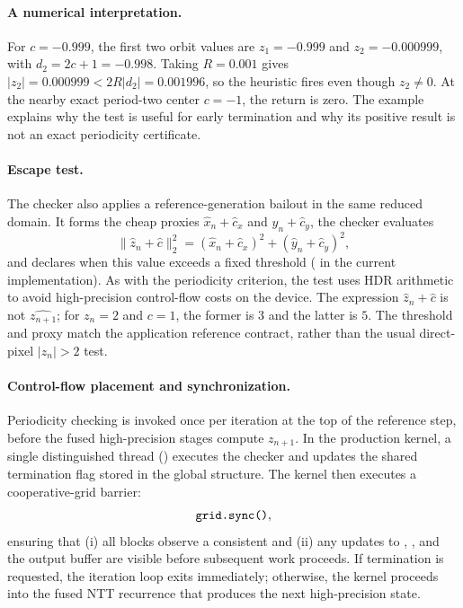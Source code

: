 \paragraph{A numerical interpretation.}
For $c=-0.999$, the first two orbit values are $z_1=-0.999$ and
$z_2=-0.000999$, with $d_2=2c+1=-0.998$.  Taking $R=0.001$ gives
$|z_2|=0.000999<2R|d_2|=0.001996$, so the heuristic fires even though
$z_2\ne0$.  At the nearby exact period-two center $c=-1$, the return
is zero.  The example explains why the test is useful for early termination
and why its positive result is not an exact periodicity certificate.

\paragraph{Escape test.}
The checker also applies a reference-generation bailout in the same reduced
domain.  It forms the cheap proxies
\(
\widehat{x}_n + \widehat{c}_x
\)
and
\(
\widehat{y}_n + \widehat{c}_y
\),
the checker evaluates
\begin{equation}
  \lVert\widehat{z}_n + \widehat{c}\rVert_2^2
  = (\widehat{x}_n + \widehat{c}_x)^2 + (\widehat{y}_n + \widehat{c}_y)^2,
  \label{eq:gpu-escape-norm}
\end{equation}
and declares  when this value exceeds a fixed threshold
( in the current implementation). As with the periodicity
criterion, the test uses HDR arithmetic to avoid high-precision control-flow
costs on the device. The expression
$\widehat z_n+\widehat c$ is not $\widehat{z_{n+1}}$; for $z_n=2$ and
$c=1$, the former is $3$ and the latter is $5$.  The threshold and proxy
match the application reference contract, rather than the usual direct-pixel
$|z_n|>2$ test.

\paragraph{Control-flow placement and synchronization.}
Periodicity checking is invoked once per iteration at the top of the reference
step, before the fused high-precision stages compute
\(z_{n+1}\). In the production kernel, a single distinguished thread
() executes the checker and updates the shared
termination flag stored in the global  structure. The kernel
then executes a cooperative-grid barrier:
\begin{equation}
  \texttt{grid.sync()},
  \label{eq:grid-sync}
\end{equation}
ensuring that (i) all blocks observe a consistent  and
(ii) any updates to , , and the output buffer are
visible before subsequent work proceeds. If termination is requested, the
iteration loop exits immediately; otherwise, the kernel proceeds into the
fused NTT recurrence that produces the next high-precision state.

